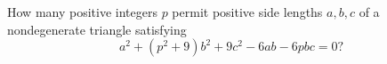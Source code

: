 How many positive integers $p$ permit positive side lengths $a,b,c$ of a nondegenerate triangle satisfying
\[
a^2+(p^2+9)b^2+9c^2-6ab-6pbc=0?
\]
